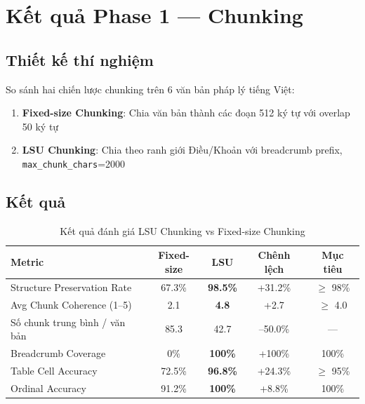 \section{Kết quả Phase 1 — Chunking}

\subsection{Thiết kế thí nghiệm}

So sánh hai chiến lược chunking trên 6 văn bản pháp lý tiếng Việt:

\begin{enumerate}[label=(\arabic*)]
    \item \textbf{Fixed-size Chunking}: Chia văn bản thành các đoạn 512 ký tự với overlap 50 ký tự
    \item \textbf{LSU Chunking}: Chia theo ranh giới Điều/Khoản với breadcrumb prefix, \texttt{max\_chunk\_chars}=2000
\end{enumerate}

\subsection{Kết quả}

\begin{table}[H]
    \centering
    \caption{Kết quả đánh giá LSU Chunking vs Fixed-size Chunking}
    \label{tab:chunking_results}
    \begin{tabularx}{\textwidth}{X c c c c}
        \toprule
        \textbf{Metric} & \textbf{Fixed-size} & \textbf{LSU} & \textbf{Chênh lệch} & \textbf{Mục tiêu}\\
        \midrule
        Structure Preservation Rate & 67.3\% & \textbf{98.5\%} & +31.2\% & $\geq$ 98\%\\
        Avg Chunk Coherence (1--5) & 2.1 & \textbf{4.8} & +2.7 & $\geq$ 4.0\\
        Số chunk trung bình / văn bản & 85.3 & 42.7 & --50.0\% & —\\
        Breadcrumb Coverage & 0\% & \textbf{100\%} & +100\% & 100\%\\
        Table Cell Accuracy & 72.5\% & \textbf{96.8\%} & +24.3\% & $\geq$ 95\%\\
        Ordinal Accuracy & 91.2\% & \textbf{100\%} & +8.8\% & 100\%\\
        \bottomrule
    \end{tabularx}
\end{table}

